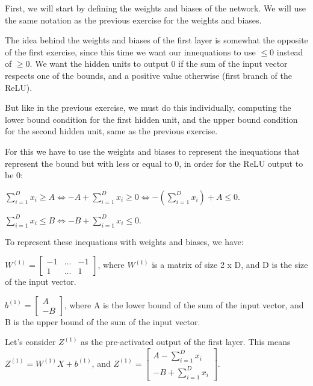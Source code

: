\documentclass{article}
\begin{document}
First, we will start by defining the weights and biases of the network. We will use the same notation as the previous 
exercise for the weights and biases.

\bigskip

The idea behind the weights and biases of the first layer is somewhat the opposite of the first exercise, since this time we want our innequations
to use $\leq 0$ instead of $\geq 0$. We want the hidden units to output 0 if the sum of the input vector respects one of the bounds, 
and a positive value otherwise (first branch of the ReLU).

But like in the previous exercise, we must do this individually, computing the lower bound condition for the first hidden unit, 
and the upper bound condition for the second hidden unit, same as the previous exercise.

\bigskip

For this we have to use the weights and biases to represent the inequations that represent the bound but with less or equal to 0, in order for
the ReLU output to be 0:

\bigskip

$ \sum_{i=1}^{D} x_i \geq A \iff -A + \sum_{i=1}^{D} x_i \geq 0 \iff -(\sum_{i=1}^{D} x_i) + A \leq 0$.

\medskip

$ \sum_{i=1}^{D} x_i \leq B \iff -B + \sum_{i=1}^{D} x_i \leq 0$.

\bigskip

To represent these inequations with weights and biases, we have:

\bigskip

\( W^{(1)} = \begin{bmatrix}
    -1 & ...  & -1\\
    1 & ... & 1
\end{bmatrix}
\), where \(W^{(1)}\) is a matrix of size 2 x D, and D is the size of the input vector.

\bigskip

\(b^{(1)} = \begin{bmatrix}
    A\\
    -B
\end{bmatrix}
\), where A is the lower bound of the sum of the input vector, and B is the upper bound of the sum of the input vector.

\bigskip

Let's consider $Z^{(1)}$ as the pre-activated output of the first layer. This means $Z^{(1)} = W^{(1)}X + b^{(1)}$, and
$Z^{(1)} = \begin{bmatrix}
    A -\sum_{i=1}^{D} x_i\\
    -B + \sum_{i=1}^{D} x_i
\end{bmatrix}
$.
\end{document}
